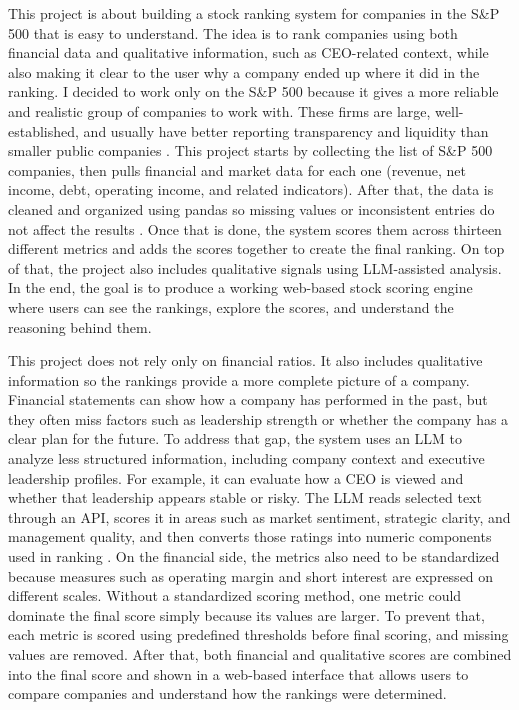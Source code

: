 \documentclass[12pt]{article}
\begin{document}
This project is about building a stock ranking system for companies in the S\&P 500 that is easy to understand. The idea is to rank companies using both financial data and qualitative information, such as CEO-related context, while also making it clear to the user why a company ended up where it did in the ranking. I decided to work only on the S\&P 500 because it gives a more reliable and realistic group of companies to work with. These firms are large, well-established, and usually have better reporting transparency and liquidity than smaller public companies \cite{SPGlobal2016Methodology}. This project starts by collecting the list of S\&P 500 companies, then pulls financial and market data for each one (revenue, net income, debt, operating income, and related indicators). After that, the data is cleaned and organized using pandas so missing values or inconsistent entries do not affect the results \cite{McKinney2010Pandas}. Once that is done, the system scores them across thirteen different metrics and adds the scores together to create the final ranking. On top of that, the project also includes qualitative signals using LLM-assisted analysis. In the end, the goal is to produce a working web-based stock scoring engine where users can see the rankings, explore the scores, and understand the reasoning behind them.

This project does not rely only on financial ratios. It also includes qualitative information so the rankings provide a more complete picture of a company. Financial statements can show how a company has performed in the past, but they often miss factors such as leadership strength or whether the company has a clear plan for the future. To address that gap, the system uses an LLM to analyze less structured information, including company context and executive leadership profiles. For example, it can evaluate how a CEO is viewed and whether that leadership appears stable or risky. The LLM reads selected text through an API, scores it in areas such as market sentiment, strategic clarity, and management quality, and then converts those ratings into numeric components used in ranking \cite{Schumaker2009Textual,dos-santos-pinheiro-dras-2017-stock}. On the financial side, the metrics also need to be standardized because measures such as operating margin and short interest are expressed on different scales. Without a standardized scoring method, one metric could dominate the final score simply because its values are larger. To prevent that, each metric is scored using predefined thresholds before final scoring, and missing values are removed. After that, both financial and qualitative scores are combined into the final score and shown in a web-based interface that allows users to compare companies and understand how the rankings were determined.
\end{document}
